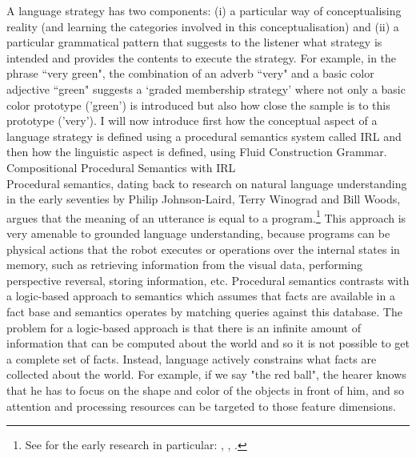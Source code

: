 A language strategy has two components: (i) a particular way of conceptualising reality (and learning the categories involved
in this conceptualisation) and (ii) a particular grammatical pattern that suggests to the listener what strategy is intended 
and provides the contents to execute the strategy. For example, in the phrase ``very green", the combination of an adverb 
``very" and a basic color adjective ``green" suggests a `graded membership strategy' where not only a basic color prototype
('green') is introduced but also how close the sample is to this prototype ('very'). I will now introduce first how 
the conceptual aspect of a language strategy is defined using a procedural semantics system called IRL and then how the 
linguistic aspect is defined, using Fluid Construction Grammar. \\ 

{\bfshape Compositional Procedural Semantics with IRL}\\

Procedural semantics, dating back to research on natural language understanding in the 
early seventies by Philip Johnson-Laird, Terry Winograd and Bill Woods, argues that the meaning of an utterance is 
equal to a program.\footnote{See for the early research in particular: \cite{Winograd:1971}, \cite{Woods:1981}, 
\cite{Johnson-Laird:1977}.} 
This approach is very amenable to grounded language understanding, because programs can be physical 
actions that the robot executes or operations over the internal states in memory, such as retrieving information
from the visual data, performing perspective reversal, storing information, etc. Procedural semantics
contrasts with a logic-based approach to semantics which assumes that facts are available in a fact base and semantics operates
by matching queries against this database. The problem for a logic-based approach
is that there is an infinite amount of
information that can be computed about the world and so it is not possible to get a 
complete set of facts. Instead, language actively constrains what facts are collected about the world. For example, if 
we say "the red ball", the hearer knows that he has to focus on the shape and color of the objects in front of him, 
and so attention and processing resources can be targeted to those feature dimensions. 

